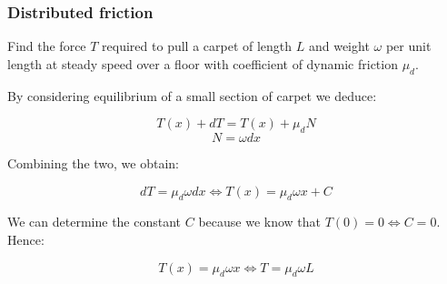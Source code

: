 \documentclass{article}
\begin{document}
\subsubsection{Distributed friction}

\begin{example}
    Find the force $T$ required to pull a carpet of length $L$ and weight $\omega$ per unit length at steady speed over a floor with coefficient of dynamic friction $\mu_d$.

    By considering equilibrium of a small section of carpet we deduce:

    \[ T(x) + dT = T(x) + \mu_dN \]
    \[ N = \omega dx \]

    Combining the two, we obtain:

    \[ dT = \mu_d \omega dx \iff T(x) = \mu_d \omega x + C\]

    We can determine the constant $C$ because we know that $T(0) = 0 \iff C = 0$. Hence:

    \[ T(x) = \mu_d \omega x \iff T = \mu_d \omega L \]
\end{example}
\end{document}
